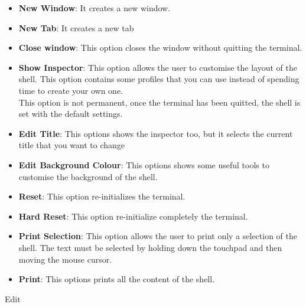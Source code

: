 \documentclass[hidelinks,12pt,a4paper,numbers=enddot]{scrartcl}
\begin{document}
\begin{itemize}
    \item \textbf{New Window}: It creates a new window.
    \item \textbf{New Tab}: It creates a new tab
    \item \textbf{Close window}: This option closes the window without quitting the terminal.
    \item \textbf{Show Inspector}:
        This option allows the user to customise the layout of the shell.
        This option contains some profiles that you can use instead of spending
        time to create your own one.\\
        This option is not permanent, once the terminal has been quitted, the shell is set
        with the default settings.
    

    \item \textbf{Edit Title}:
        This options shows the inspector too, but it selects the current title that
        you want to change
    
    \item \textbf{Edit Background Colour}:
        This options shows some useful tools to customise the background of the shell.
    
    \item \textbf{Reset}: This option re-initializes the terminal.
    \item \textbf{Hard Reset}: This option re-initialize completely the terminal.
    \item \textbf{Print Selection}:
        This option allows the user to print only a selection of the shell.
        The text must be selected by holding down the touchpad and then moving the mouse cursor.
    
    \item \textbf{Print}: This options prints all the content of the shell.
\end{itemize}

Edit
\end{document}
